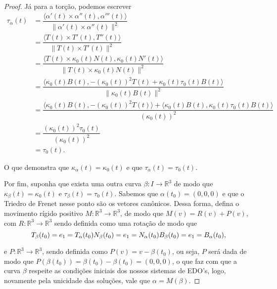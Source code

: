 \documentclass[11pt,letterpaper,twocolumn]{article}
\begin{document}
\begin{proof}
    Já para a torção, podemos escrever 
    \begin{equation*}
        \begin{split}
            \tau_\alpha(t) & = \dfrac{\langle \alpha'(t)\times \alpha''(t), \alpha'''(t)\rangle}{\|\alpha'(t)\times \alpha''(t)\|^2} \\
            & = \dfrac{\langle T(t)\times T'(t), T''(t)\rangle}{\|T(t)\times T'(t)\|^2} \\
            & = \dfrac{\langle T(t)\times \kappa_0(t)N(t), \kappa_0(t)N'(t)\rangle}{\|T(t)\times \kappa_0(t)N(t)\|^2} \\
            & = \dfrac{\langle \kappa_0(t)B(t), -(\kappa_0(t))^2T(t) + \kappa_0(t)\tau_0(t)B(t)\rangle}{\|\kappa_0(t)B(t)\|^2} \\
            & = \dfrac{\langle \kappa_0(t)B(t), -\left(\kappa_0(t)\right)^2T(t)\rangle + \langle \kappa_0(t)B(t), \kappa_0(t)\tau_0(t)B(t)\rangle}{\left(\kappa_0(t)\right)^2} \\
            & = \dfrac{\left(\kappa_0(t)\right)^2\tau_0(t)}{\left(\kappa_0(t)\right)^2} \\
            & = \tau_0(t).
        \end{split}
    \end{equation*}
    
    O que demonstra que $\kappa_\alpha(t) = \kappa_0(t)$ e que $\tau_\alpha(t) = \tau_0(t)$.
    
    Por fim, suponha que exista uma outra curva $\beta : I\to \mathbb{R}^3$ de modo que $\kappa_\beta(t) = \kappa_0(t)$ e $\tau_\beta(t) = \tau_0(t)$. Sabemos que $\alpha(t_0) = (0, 0, 0)$ e que o Triedro de Frenet nesse ponto são os vetores canônicos. Dessa forma, defina o movimento rígido positivo $M : \mathbb{R}^3\to \mathbb{R}^3$, de modo que $M(v) = R(v) + P(v)$, com $R : \mathbb{R}^3\to \mathbb{R}^3$ sendo definida como uma rotação de modo que
    \begin{equation*}
        T_\beta(t_0) = e_1 = T_\alpha(t_0) \\
        N_\beta(t_0) = e_1 = N_\alpha(t_0) \\
        B_\beta(t_0) = e_1 = B_\alpha(t_0),
    \end{equation*}
    
    \noindent e $P : \mathbb{R}^3\to \mathbb{R}^3$, sendo definida como $P(v) = v - \beta(t_0)$, ou seja, $P$ será dada de modo que $P(\beta(t_0)) = \beta(t_0) - \beta(t_0) = (0, 0, 0)$, o que faz com que a curva $\beta$ respeite as condições iniciais dos nossos sistemas de EDO's, logo, novamente pela unicidade das soluções, vale que $\alpha = M(\beta)$.
\end{proof}
\end{document}
